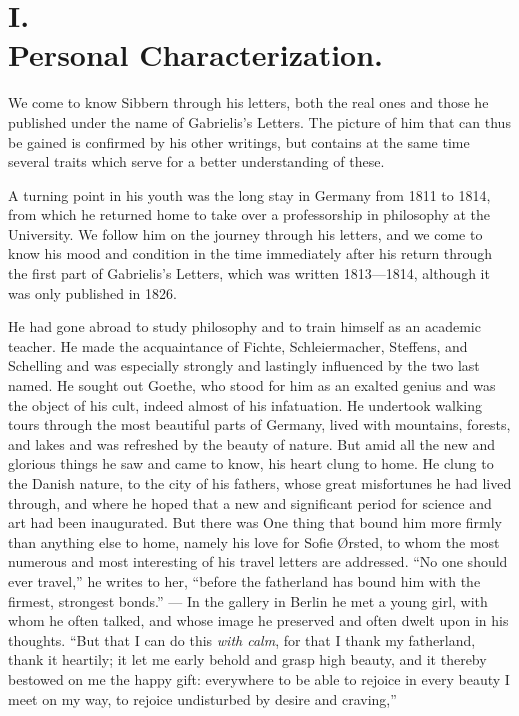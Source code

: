 \documentclass[12pt,a4paper,openany]{book}
\newcommand{\opage}[1]{\marginnote{\footnotesize\textit{[#1]}}}
\begin{document}
\section*{I.\\  Personal Characterization.}

We come to know Sibbern through his letters, both the
real ones and those he published under the name of Gabrielis's
Letters. The picture of him that can thus be gained is confirmed
by his other writings, but contains at the same time several
traits which serve for a better understanding of these.

A turning point in his youth was the long
stay in Germany from 1811 to 1814, from which he returned
home to take over a professorship in philosophy at the
University. We follow him on the journey through his letters, and we
come to know his mood and condition in the time immediately after
his return through the first part of Gabrielis's
Letters, which was written 1813---1814, although it was only
published in 1826.

He had gone abroad to study philosophy and to train himself
as an academic teacher. He made the acquaintance of Fichte, Schleiermacher,
Steffens, and Schelling and was especially strongly and
lastingly influenced by the two last named. He sought out Goethe, who
stood for him as an exalted genius and was the object of
his cult, indeed almost of his infatuation. He undertook
walking tours through the most beautiful parts of Germany, lived
with mountains, forests, and lakes and was refreshed by the beauty of nature.
But amid all the new and glorious things he saw and
came to know, his heart clung to home. He clung
to the Danish nature, to the city of his fathers, whose great
misfortunes he had lived through, and where he hoped that a new
and significant period for science and art had
been inaugurated. But there was One thing that bound him more firmly than
anything else to home, namely his love for Sofie
\opage{65}Ørsted, to whom the most numerous and most interesting of his
travel letters are addressed. ``No one should ever travel,'' he writes
to her, ``before the fatherland has bound him with
the firmest, strongest bonds.'' --- In the gallery in Berlin he met
a young girl, with whom he often talked, and whose image
he preserved and often dwelt upon in his thoughts. ``But that
I can do this \emph{with calm}, for that I thank my fatherland,
thank it heartily; it let me early behold and grasp
high beauty, and it thereby bestowed on me the happy
gift: everywhere to be able to rejoice in every beauty I meet
on my way, to rejoice undisturbed by desire and craving,''
\end{document}
